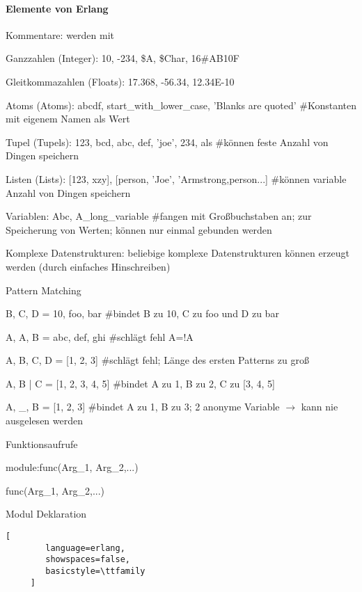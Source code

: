 \documentclass[10pt]{article}
\begin{document}
\begin{itemize*}
\paragraph{Elemente von Erlang}
\begin{itemize*}
  \item Kommentare: werden mit %
  \item Ganzzahlen (Integer): 10, -234, \$A, \$Char, 16\#AB10F
  \item Gleitkommazahlen (Floats): 17.368, -56.34, 12.34E-10
  \item Atoms (Atoms): abcdf, start\_with\_lower\_case, 'Blanks are quoted' \#Konstanten mit eigenem Namen als Wert
  \item Tupel (Tupels): {123, bcd}, {abc, {def, 'joe', 234}, als} \#können feste Anzahl von Dingen speichern
  \item Listen (Lists): [123, xzy], [{person, 'Joe', 'Armstrong},{person...}] \#können variable Anzahl von Dingen speichern
  \item Variablen: Abc, A\_long\_variable \#fangen mit Großbuchstaben an; zur Speicherung von Werten; können nur einmal gebunden werden
  \item Komplexe Datenstrukturen: beliebige komplexe Datenstrukturen können erzeugt werden (durch einfaches Hinschreiben)
  \item Pattern Matching
  \begin{itemize*}
    \item {B, C, D} = {10, foo, bar} \#bindet B zu 10, C zu foo und D zu bar
    \item {A, A, B} = {abc, def, ghi} \#schlägt fehl A=!A
    \item [A, B, C, D] = [1, 2, 3] \#schlägt fehl; Länge des ersten Patterns zu groß
    \item [A, B | C] = [1, 2, 3, 4, 5] \#bindet A zu 1, B zu 2, C zu [3, 4, 5]
    \item [A, \_, B ] = [1, 2, 3] \#bindet A zu 1, B zu 3; 2 anonyme Variable $\rightarrow$ kann nie ausgelesen werden
  \end{itemize*}
  \item Funktionsaufrufe
  \begin{itemize*}
    \item module:func(Arg\_1, Arg\_2,...)
    \item func(Arg\_1, Arg\_2,...)
  \end{itemize*}
  \item Modul Deklaration
  \begin{lstlisting}[
        language=erlang,
        showspaces=false,
        basicstyle=\ttfamily
     ]

\end{lstlisting}
\end{itemize*}
\end{itemize*}
\end{document}
